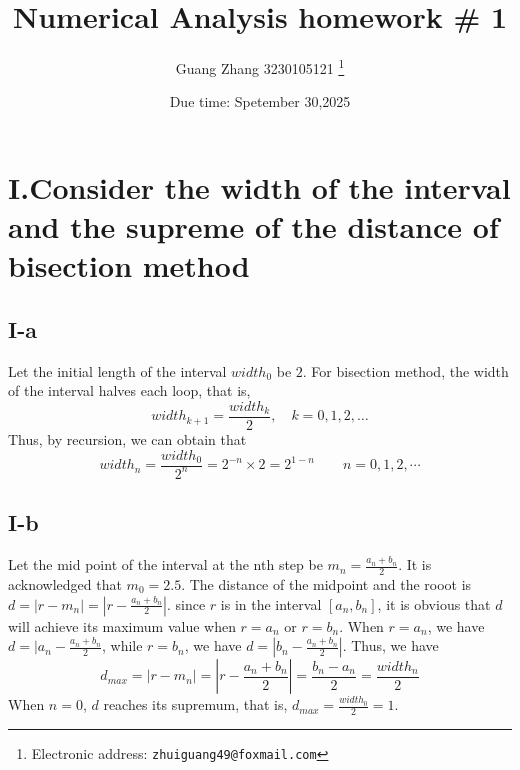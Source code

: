 \documentclass[a4paper]{article}
\begin{document}
\title{Numerical Analysis homework \# 1}

\author{Guang Zhang 3230105121
  \thanks{Electronic address: \texttt{zhuiguang49@foxmail.com}}}


\date{Due time: Spetember 30,2025}

\maketitle






\section*{I.Consider the width of the interval and the supreme of the distance of bisection method}

\subsection*{I-a}

Let the initial length of the interval $width_0$ be $2$. For bisection method, the width of the interval halves each loop, that is,
\begin{equation}
    width_{k+1} = \frac{width_k}{2}, \quad k = 0,1,2,\dots
\end{equation}
Thus, by recursion, we can obtain that
\begin{equation}
    width_n = \frac{width_0}{2^n} = 2^{-n}\times 2=2^{1-n} \qquad n=0,1,2,\cdots
\end{equation}    

\subsection*{I-b}
Let the mid point of the interval at the nth step be $m_n=\frac{a_n+b_n}{2}$. It is acknowledged that $m_0 = 2.5$. The distance of the midpoint and the rooot is $d=|r-m_n|=|r-\frac{a_n+b_n}{2}|$.
since $r$ is in the interval $[a_n,b_n]$, it is obvious that $d$ will achieve its maximum value when $r=a_n$ or $r=b_n$.
When $r=a_n$, we have $d = |a_n-\frac{a_n+b_n}{2}$, while $r=b_n$, we have $d = |b_n-\frac{a_n+b_n}{2}|$.
Thus, we have
\begin{equation}
    d_{max} = |r-m_n| = |r-\frac{a_n+b_n}{2}|  = \frac{b_n-a_n}{2} = \frac{width_n}{2}
\end{equation}
When $n=0$, $d$ reaches its supremum, that is, $d_{max} = \frac{width_0}{2} = 1$. 
\end{document}
